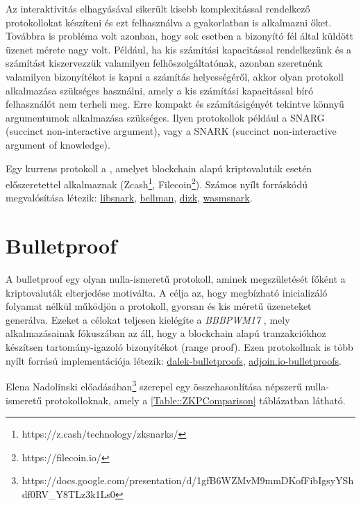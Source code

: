 Az interaktivitás elhagyásával sikerült kisebb komplexitással rendelkező protokollokat készíteni és ezt felhasználva a gyakorlatban is alkalmazni őket. Továbbra is probléma volt azonban, hogy sok esetben a bizonyító fél által küldött üzenet mérete nagy volt. Például, ha kis számítási kapacitással rendelkezünk és a számítást kiszervezzük valamilyen felhőszolgáltatónak, azonban szeretnénk valamilyen bizonyítékot is kapni a számítás helyességéről, akkor olyan protokoll alkalmazása szükséges használni, amely a kis számítási kapacitással bíró felhasználót nem terheli meg. Erre kompakt és számításigényét tekintve könnyű argumentumok alkalmazása szükséges. Ilyen protokollok például a SNARG (succinct non-interactive argument), vagy a SNARK (succinct non-interactive argument
of knowledge).

Egy kurrens protokoll a \cite{SNARK}, amelyet blockchain alapú kriptovaluták esetén előszeretettel alkalmaznak (Zcash\footnote{https://z.cash/technology/zksnarks/}, Filecoin\footnote{https://filecoin.io/}). Számos nyílt forráskódú megvalósítása létezik: \href{https://github.com/scipr-lab/libsnark}{libsnark}, \href{https://github.com/zkcrypto/bellman}{bellman}, \href{https://github.com/scipr-lab/dizk}{dizk}, \href{https://github.com/iden3/wasmsnark}{wasmsnark}.

\section{Bulletproof}

A bulletproof egy olyan nulla-ismeretű protokoll, aminek megszületését főként a kriptovaluták elterjedése motiválta. A célja az, hogy megbízható inicializáló folyamat nélkül működjön a protokoll, gyorsan és kis méretű üzeneteket generálva. Ezeket a célokat teljesen kielégíte a \textit{BBBPWM17} \cite{BULLETPROOF}, mely alkalmazásainak fókuszában az áll, hogy a blockchain alapú tranzakciókhoz készítsen tartomány-igazoló bizonyítékot (range proof). Ezen protokollnak is több nyílt forrású implementációja létezik: \href{https://github.com/dalek-cryptography/bulletproofs}{dalek-bulletproofs}, \href{https://github.com/adjoint-io/bulletproofs}{adjoin.io-bulletproofs}.

Elena Nadolinski előadásában\footnote{https://docs.google.com/presentation/d/1gfB6WZMvM9mmDKofFibIgsyYShdf0RV\_Y8TLz3k1Ls0} szerepel egy összehasonlítása népszerű nulla-ismeretű protokolloknak, amely a \ref{Table::ZKPComparison} táblázatban látható.

